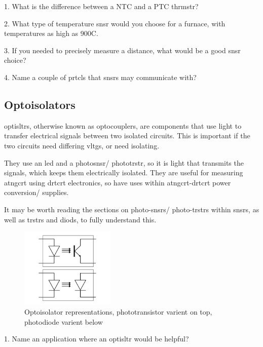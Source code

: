 \documentclass[a4paper,11pt]{report}
\newcommand{\Quiz}[1] %
{
\par\noindent %
\phantomsection %
\todo[inline, color=blue!30]{\textbf{#1}} %
\vspace{1em} %
}
\begin{document}
\Quiz{Quiz}

1. What is the difference between a NTC and a PTC \gls{thrmstr}?

2. What type of temperature \gls{snsr} would you choose for a furnace, with temperatures as high as 900\degree C.

3. If you needed to precisely measure a distance, what would be a good \gls{snsr} choice?

4. Name a couple of \gls{prtcl}s that \gls{snsr}s may communicate with?

\vspace*{1\baselineskip}

\subsection{Optoisolators}

\gls{optisltr}s, otherwise known as optocouplers, are components that use light to transfer electrical signals between two isolated circuits. This is important if the two circuits need differing \gls{vltg}s, or need isolating.

They use an \gls{led} and a photo\gls{snsr}/ photo\gls{trstr}, so it is light that transmits the signals, which keeps them electrically isolated. They are useful for measuring \gls{atngcrt} using \gls{drtcrt} electronics, so have uses within \gls{atngcrt}-\gls{drtcrt} power conversion/ supplies.

It may be worth reading the sections on photo-\gls{snsr}s/ photo-\gls{trstr}s within \gls{snsr}s, as well as \gls{trstr}s and \gls{diod}s, to fully understand this.

\begin{figure}[H]
\centering
\includegraphics[width=0.4\textwidth]{optoisolator1}
\caption{Optoisolator representations, phototransistor varient on top, photodiode varient below}
\end{figure}

\Quiz{Quiz}

1. Name an application where an \gls{optisltr} would be helpful?
\end{document}
